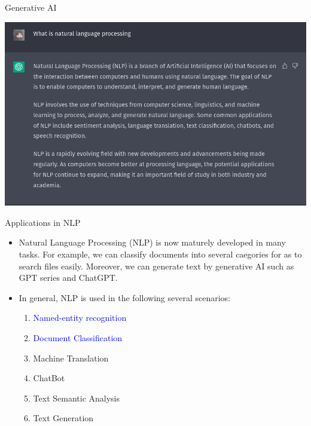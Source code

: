 \begin{frame}[fragile]{Generative AI}

  \includegraphics[scale=0.35]{../images/img_1.png}

\end{frame}

\begin{frame}[fragile]{Applications in NLP}

  \begin{itemize}
    \item Natural Language Processing (NLP) is now maturely developed in many tasks. For example, we can classify documents into several caegories for as to search files easily. Moreover, we can generate text by generative AI such as GPT series and ChatGPT.
    \item In general, NLP is used in the following several scenarios:
          \begin{enumerate}
            \item \textcolor{blue}{Named-entity recognition}
            \item \textcolor{blue}{Document Classification}
            \item Machine Translation
            \item ChatBot
            \item Text Semantic Analysis
            \item Text Generation
          \end{enumerate}
  \end{itemize}

\end{frame}